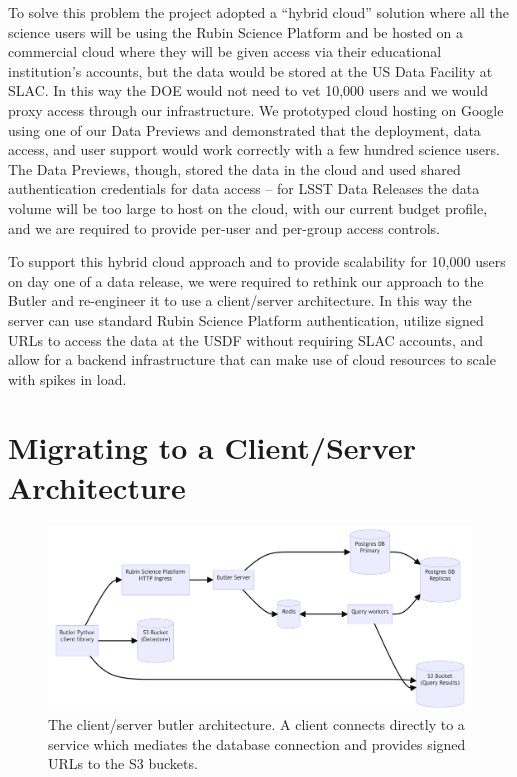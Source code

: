 To solve this problem the project adopted a ``hybrid cloud'' solution \cite{2024SPIE13101.86Otmp} where all the science users will be using the Rubin Science Platform \cite{LDM-542} and be hosted on a commercial cloud where they will be given access via their educational institution's accounts, but the data would be stored at the US Data Facility at SLAC.
In this way the DOE would not need to vet 10,000 users and we would proxy access through our infrastructure.
We prototyped cloud hosting on Google using one of our Data Previews \cite{2021arXiv211115030O} and demonstrated that the deployment, data access, and user support would work correctly with a few hundred science users.
The Data Previews, though, stored the data in the cloud and used shared authentication credentials for data access -- for LSST Data Releases the data volume will be too large to host on the cloud, with our current budget profile, and we are required to provide per-user and per-group access controls.

To support this hybrid cloud approach and to provide scalability for 10,000 users on day one of a data release, we were required to rethink our approach to the Butler and re-engineer it to use a client/server architecture.
In this way the server can use standard Rubin Science Platform authentication, \cite{DMTN-182} utilize signed URLs to access the data at the USDF without requiring SLAC accounts, \cite{DMTN-284} and allow for a backend infrastructure that can make use of cloud resources to scale with spikes in load.

\section{Migrating to a Client/Server Architecture}

\begin{figure}
\centering
\includegraphics[width=\textwidth]{butler-client-server}
\caption{The client/server butler architecture. A client connects directly to a service which mediates the database connection and provides signed URLs to the S3 buckets.\label{fig:server}}
\end{figure}

